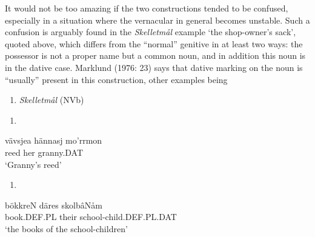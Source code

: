 It would not be too amazing if the two constructions tended to be confused, especially in a situation where the vernacular in general becomes unstable. Such a confusion is arguably found in the \textit{Skelletmål} example ‘the shop-owner’s sack’, quoted above, which differs from the “normal” genitive in at least two ways: the possessor is not a proper name but a common noun, and in addition this noun is in the dative case. Marklund (1976: 23) says that dative marking on the noun is “usually” present in this construction, other examples being 

\begin{enumerate} %
\item 
\label{bkm:Ref136428236}\textit{Skelletmål} (NVb)
\end{enumerate} %
\setcounter{listLFOxcviiileveli}{0}
\begin{enumerate} %
\item 
\end{enumerate} %
\ea\label{}
\gll vävsjea  hännasj  mo’rrmon\\


reed  her  granny.DAT\\ %


‘Granny’s reed’
\z


\begin{enumerate} %
\item 
\end{enumerate} %
\ea\label{}
\gll bökkreN  däres  skolbâNåm\\


book.DEF.PL  their  school-child.DEF.PL.DAT\\ %


‘the books of the school-children’
\z


